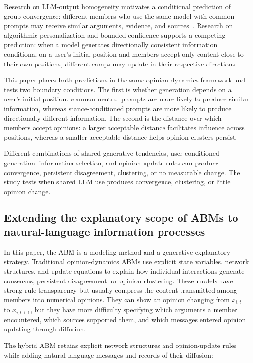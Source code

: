 \documentclass[11pt,a4paper]{article}
\begin{document}
Research on LLM-output homogeneity motivates a conditional prediction of group convergence: different members who use the same model with common prompts may receive similar arguments, evidence, and sources~\citep{jiang2025}. Research on algorithmic personalization and bounded confidence supports a competing prediction: when a model generates directionally consistent information conditional on a user's initial position and members accept only content close to their own positions, different camps may update in their respective directions~\citep{perra2019,hegselmann2002}.

This paper places both predictions in the same opinion-dynamics framework and tests two boundary conditions. The first is whether generation depends on a user's initial position: common neutral prompts are more likely to produce similar information, whereas stance-conditioned prompts are more likely to produce directionally different information. The second is the distance over which members accept opinions: a larger acceptable distance facilitates influence across positions, whereas a smaller acceptable distance helps opinion clusters persist.

Different combinations of shared generative tendencies, user-conditioned generation, information selection, and opinion-update rules can produce convergence, persistent disagreement, clustering, or no measurable change. The study tests when shared LLM use produces convergence, clustering, or little opinion change.

\subsection{Extending the explanatory scope of ABMs to natural-language information processes}

In this paper, the ABM is a modeling method and a generative explanatory strategy. Traditional opinion-dynamics ABMs use explicit state variables, network structures, and update equations to explain how individual interactions generate consensus, persistent disagreement, or opinion clustering. These models have strong rule transparency but usually compress the content transmitted among members into numerical opinions. They can show an opinion changing from $x_{i,t}$ to $x_{i,t+1}$, but they have more difficulty specifying which arguments a member encountered, which sources supported them, and which messages entered opinion updating through diffusion.

The hybrid ABM retains explicit network structures and opinion-update rules while adding natural-language messages and records of their diffusion:
\end{document}
